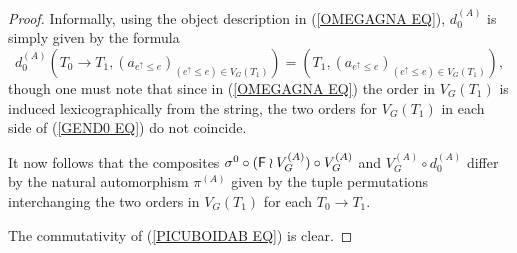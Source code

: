 \documentclass[a4paper,10pt]{article}%
\begin{document}
\begin{proof}
Informally, using the object description in (\ref{OMEGAGNA EQ}),
$d_0^{(A)}$ is simply given by the formula
\begin{equation}\label{GEND0 EQ}
d_0^{(A)} \left(
T_0 \to T_1,
(a_{e^{\uparrow} \leq e})_{(e^{\uparrow} \leq e)\in V_G(T_1)}
\right)
=
\left(
T_1,
(a_{e^{\uparrow} \leq e})_{(e^{\uparrow} \leq e)\in V_G(T_1)}
\right),
\end{equation}
though one must note that since in (\ref{OMEGAGNA EQ}) the
order in $V_G(T_1)$ is induced lexicographically from the string, the two orders for $V_G(T_1)$ in each side of (\ref{GEND0 EQ})
do not coincide.

It now follows that the composites 
$\sigma^0 \circ (\mathsf{F} \wr V_G^{(A)}) \circ V_G^{(A)}$
and 
$V_G^{(A)} \circ d_0^{(A)}$
differ by the natural automorphism $\pi^{(A)}$
given by the tuple permutations interchanging the two orders in
$V_G(T_1)$ for each $T_0 \to T_1$.

The commutativity of (\ref{PICUBOIDAB EQ}) is clear.
\end{proof}
\end{document}
